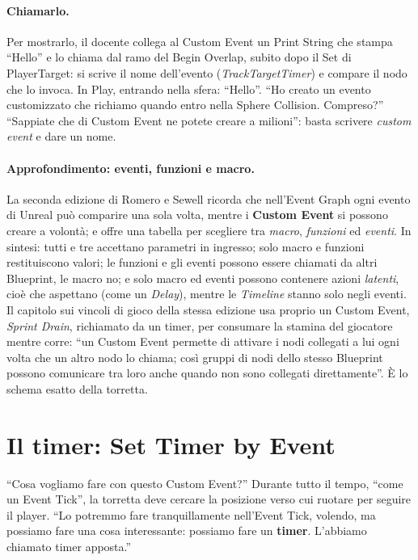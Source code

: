 \paragraph{Chiamarlo.} Per mostrarlo, il docente collega al Custom Event un Print String
che stampa ``Hello'' e lo chiama dal ramo del Begin Overlap, subito dopo il Set di
PlayerTarget: si scrive il nome dell'evento (\emph{TrackTargetTimer}) e compare il nodo
che lo invoca. In Play, entrando nella sfera: ``Hello''. ``Ho creato un evento
customizzato che richiamo quando entro nella Sphere Collision. Compreso?'' ``Sappiate
che di Custom Event ne potete creare a milioni'': basta scrivere \emph{custom event} e
dare un nome.

\paragraph{Approfondimento: eventi, funzioni e macro.} La seconda edizione di Romero e
Sewell ricorda che nell'Event Graph ogni evento di Unreal può comparire una sola volta,
mentre i \textbf{Custom Event} si possono creare a volontà; e offre una tabella per
scegliere tra \emph{macro}, \emph{funzioni} ed \emph{eventi}. In sintesi: tutti e tre
accettano parametri in ingresso; solo macro e funzioni restituiscono valori; le funzioni
e gli eventi possono essere chiamati da altri Blueprint, le macro no; e solo macro ed
eventi possono contenere azioni \emph{latenti}, cioè che aspettano (come un
\emph{Delay}), mentre le \emph{Timeline} stanno solo negli eventi. Il capitolo sui
vincoli di gioco della stessa edizione usa proprio un Custom Event, \emph{Sprint Drain},
richiamato da un timer, per consumare la stamina del giocatore mentre corre: ``un Custom
Event permette di attivare i nodi collegati a lui ogni volta che un altro nodo lo
chiama; così gruppi di nodi dello stesso Blueprint possono comunicare tra loro anche
quando non sono collegati direttamente''. È lo schema esatto della torretta.

\section{Il timer: Set Timer by Event}
\label{ue4:sec:timer}

``Cosa vogliamo fare con questo Custom Event?'' Durante tutto il tempo, ``come un Event
Tick'', la torretta deve cercare la posizione verso cui ruotare per seguire il player.
``Lo potremmo fare tranquillamente nell'Event Tick, volendo, ma possiamo fare una cosa
interessante: possiamo fare un \textbf{timer}. L'abbiamo chiamato timer apposta.''

